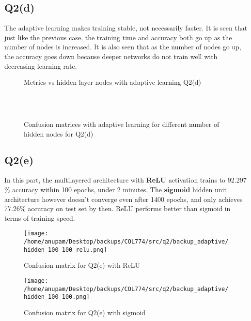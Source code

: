 \documentclass[11pt]{article}
\begin{document}
\subsection{Q2(d)}
\label{sec-2-4}
The adaptive learning makes training stable, not necessarily
faster. It is seen that just like the previous case, the training time
and accuracy both go up as the number of nodes is increased. It is
also seen that as the number of nodes go up, the accuracy goes down
because deeper networks do not train well with decreasing learning
rate.
\begin{figure}[!ht]
	\caption{Metrics vs hidden layer nodes with adaptive learning Q2(d)}
\end{figure}
\begin{figure}[!ht]
	\\
	\\
	\caption{Confusion matrices with adaptive learning for different number of hidden nodes for Q2(d)}
\end{figure}

\clearpage
\subsection{Q2(e)}
\label{sec-2-5}
In this part, the multilayered architecture with \textbf{ReLU}
activation trains to 92.297\(\%\) accuracy within 100 epochs, under 2
minutes. The \textbf{sigmoid} hidden unit architecture however doesn't
converge even after 1400 epochs, and only achieves 77.26\(\%\)
accuracy on test set by then. ReLU performs better than sigmoid in
terms of training speed.
\begin{figure}[!ht]
\texttt{[image: /home/anupam/Desktop/backups/COL774/src/q2/backup\_adaptive/hidden\_100\_100\_relu.png]}
	\caption{Confusion matrix for Q2(e) with ReLU}
\end{figure}
\begin{figure}[!ht]
\texttt{[image: /home/anupam/Desktop/backups/COL774/src/q2/backup\_adaptive/hidden\_100\_100.png]}
	\caption{Confusion matrix for Q2(e) with sigmoid}
\end{figure}
\clearpage
\end{document}
